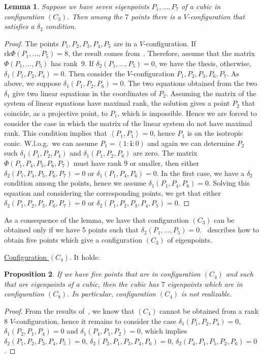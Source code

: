 \documentclass{amsart}
\theoremstyle{plain}
\newtheorem{lemma}{Lemma}[section]
\newtheorem{prop}[lemma]{Proposition}
\theoremstyle{definition}
\newcommand{\scl}[2]{\left\langle {#1}, {#2} \right\rangle}
\newcommand{\iii}{\textbf{i}}
\newcommand{\rk}{\ensuremath{\mathrm{rk}}}
\begin{document}
\begin{lemma}
\label{no_delta1_delta1} Suppose we have  seven eigenpoints $P_1, \dots, P_7$
of a cubic in configuration $(C_3)$. Then among the $7$ points there is a
$V$-configuration that satisfies a $\delta_2$ condition.
\end{lemma}
\begin{proof}
The points $P_1, P_2, P_3, P_4, P_5$ are in a $V$-configuration. If 
$\rk \Phi(P_1, \dots, P_5) = 8$, the result comes from~.
Therefore, assume that the matrix $\Phi(P_1, \dots, P_5)$ has
rank~$9$. If
$\delta_2(P_1, \dots, P_5) = 0$, we have the thesis, otherwise,
$\delta_1(P_1, P_2, P_4) = 0$. Then consider the $V$-configuration
$P_1, P_2, P_3, P_6, P_7$. As above, we suppose $\delta_1(P_1, P_2, P_6) = 0$.
The two equations obtained from the two $\delta_1$ give two
linear equations in the coordinates
of $P_2$. Assuming the matrix of the system of linear equations have
maximal rank, the solution gives a point $P_2$ that coincide, as
a projective point, to $P_1$, which is impossible. Hence we are forced to
consider the
case in which the matrix of the linear system do not have maximal rank.
This condition implies that $\scl{P_1}{P_1} = 0$, hence $P_1$ is on the
isotropic conic. W.l.o.g.\ we can assume $P_1 = (1: \iii: 0)$ and again
we can determine $P_2$ such $\delta_1(P_1, P_2, P_4)$ and
$\delta_1(P_1, P_2, P_6)$ are zero. The matrix $\Phi(P_1, P_4, P_5, P_6, P_7)$
must have rank $9$ or smaller, then either
$\delta_2(P_1, P_4, P_5, P_6, P_7)=0$ or $\delta_1(P_1, P_4, P_6) = 0$. In
the first case, we have a $\delta_2$ condition among the points, hence
we assume $\delta_1(P_1, P_4, P_6) = 0$. Solving this equation and
considering the corresponding points, we get that either
$\delta_2(P_1, P_2, P_3, P_6, P_7) = 0$ or
$\delta_2(P_1, P_2, P_3, P_4, P_5) = 0$.
\end{proof}

As a consequence of the lemma, we have that configuration $(C_3)$ can
be obtained only if we have 5 points such that
$\delta_2(P_1, \dotsc, P_5) = 0$.~ describes how to
obtain five points which give a configuration $(C_3)$ of eigenpoints.

\underline{Configuration $(C_4)$}. It holds:
\begin{prop}
\label{conf4no} If we have five points that are in
configuration $(C_4)$ and such that are eigenpoints of a cubic, then the
cubic has $7$ eigenpoints which are in configuration $(C_8)$. In particular,
configuration $(C_4)$ is not realizable.
\end{prop}
\begin{proof}
From the results of~, we know that $(C_4)$
cannot be obtained from a rank 8 $V$-configuration,
hence it remains to consider the case $\delta_1(P_1, P_2, P_4) = 0$,
$\delta_1(P_2, P_1, P_4) = 0$ and $\delta_1(P_4, P_1, P_2) = 0$,
which implies
$\delta_2(P_1, P_2, P_3, P_4, P_5)=0$,
$\delta_2(P_2, P_1, P_3, P_4, P_6)=0$,
$\delta_2(P_4, P_1, P_5, P_2, P_6)=0$.
\end{proof}
\end{document}
